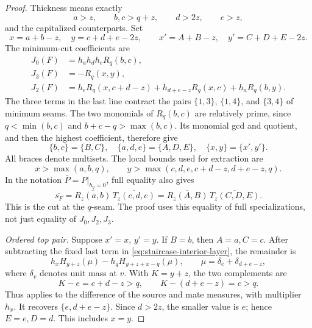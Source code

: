 \documentclass[11pt,a4paper]{amsart}
\numberwithin{equation}{section}
\theoremstyle{plain}
\theoremstyle{definition}
\begin{document}
\begin{proof}
Thickness means exactly
\[
 a>z,\qquad b,c>q+z,\qquad d>2z,\qquad e>z,
\]
and the capitalized counterparts.  Set
\[
 x=a+b-z,\quad y=c+d+e-2z,\qquad
 x'=A+B-z,\quad y'=C+D+E-2z.
\]
The minimum-cut coefficients are
\begin{align}
 J_0(F)&=h_ah_dh_eR_q(b,c),\label{eq:staircase-interior-zero}\\
 J_3(F)&=-R_q(x,y),\label{eq:staircase-interior-top}\\
 J_2(F)&=h_eR_q(x,c+d-z)
       +h_{d+e-z}R_q(x,c)+h_aR_q(b,y).
       \label{eq:staircase-interior-layer}
\end{align}
The three terms in the last line contract the pairs \(\{1,3\}\),
\(\{1,4\}\), and \(\{3,4\}\) of minimum seams.  The two monomials
of \(R_q(b,c)\) are relatively prime, since
\(q<\min(b,c)\) and \(b+c-q>\max(b,c)\).  Its monomial gcd and
quotient, and then the highest coefficient, therefore give
\begin{equation}\label{eq:staircase-interior-data}
 \{b,c\}=\{B,C\},\quad
 \{a,d,e\}=\{A,D,E\},\quad
 \{x,y\}=\{x',y'\}.
\end{equation}
All braces denote multisets.  The local bounds used for extraction are
\[
 x>\max(a,b,q),\qquad
 y>\max(c,d,e,c+d-z,d+e-z,q).
\]
In the notation \(\bar P=P|_{h_q=0}\), full equality also gives
\begin{equation}\label{eq:staircase-interior-specialization}
 \overline{s_F}=\overline{R_z(a,b)}\,
                    \overline{T_z(c,d,e)}
 =\overline{R_z(A,B)}\,\overline{T_z(C,D,E)}.
\end{equation}
This is the cut at the \(q\)-seam.  The proof uses this equality of
full specializations, not just equality of \(J_0,J_2,J_3\).

\emph{Ordered top pair.}
Suppose \(x'=x\), \(y'=y\).  If \(B=b\), then \(A=a,C=c\).
After subtracting the fixed last term in
\eqref{eq:staircase-interior-layer}, the remainder is
\[
 h_xH_{y+z}(\mu)-h_qH_{y+z+x-q}(\mu),\qquad
 \mu=\delta_e+\delta_{d+e-z},
\]
where \(\delta_v\) denotes unit mass at \(v\).
With \(K=y+z\), the two complements are
\[
 K-e=c+d-z>q,\qquad K-(d+e-z)=c>q.
\]
Thus  applies to the
difference of the source and mate measures, with multiplier \(h_x\).
It recovers \(\{e,d+e-z\}\).  Since \(d>2z\), the smaller value
is \(e\); hence \(E=e,D=d\).  This includes \(x=y\).


\end{proof}
\end{document}
